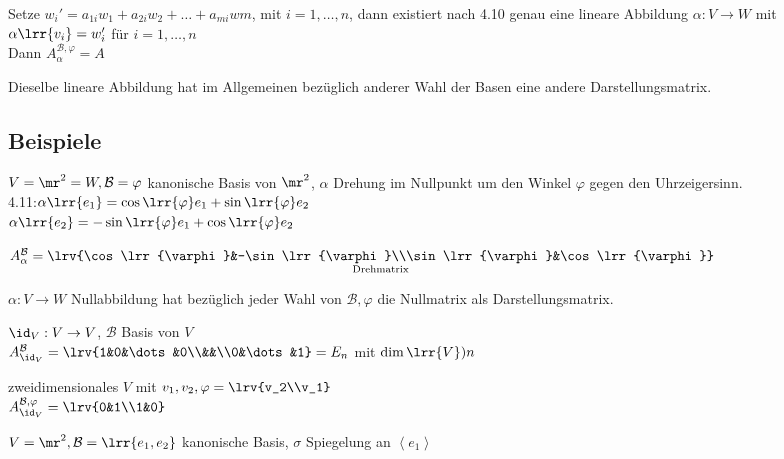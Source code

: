 			Setze $w_i'=a_{1i}w_1+a_{2i}w_2+\dots+a_{mi}w{m}$, mit $i=1,\dots,n$, dann existiert nach 4.10 genau eine lineare Abbildung $\alpha:V\rightarrow W$ mit $\alpha\lrr{v_i}=w_i'$ für $i=1,\dots,n$\\
			Dann $A_{\alpha}^{\mathcal{B}, \varphi}=A$
		\item Dieselbe lineare Abbildung hat im Allgemeinen bezüglich anderer Wahl der Basen eine andere Darstellungsmatrix.
	\subExEnd
	
\subsection{Beispiele}
		\item $V=\mr^2=W, \mathcal{B}=\varphi$ kanonische Basis von $\mr^2$, $\alpha$ Drehung im Nullpunkt um den Winkel $\varphi$ gegen den Uhrzeigersinn.\\
			4.11:$\alpha\lrr{e_1}=\cos\lrr{\varphi}e_1+\sin\lrr{\varphi}e_2$\\
			$\alpha\lrr{e_2}=-\sin\lrr{\varphi}e_1+\cos\lrr{\varphi}e_2$
			
			$A_{\alpha}^{\mathcal{B}}=\underset{\mbox{\scriptsize Drehmatrix}}{\lrv{\cos\lrr{\varphi}&-\sin\lrr{\varphi}\\\sin\lrr{\varphi}&\cos\lrr{\varphi}}}$
		\item $\alpha:V\rightarrow W$ Nullabbildung hat bezüglich jeder Wahl von $\mathcal{B},\varphi$ die Nullmatrix als Darstellungsmatrix.
		\item $\id_V:V\rightarrow V$, $\mathcal{B}$ Basis von $V$\\
			$A_{\id_V}^{\mathcal{B}}=\lrv{1&0&\dots&0\\&&\\0&\dots&1}=E_n$ mit $\dim\lrr{V})n$
		\item zweidimensionales $V$ mit $v_1,v_2,\varphi=\lrv{v_2\\v_1}$\\
			$A_{\id_V}^{\mathcal{B},\varphi}=\lrv{0&1\\1&0}$
		\item $V=\mr^2,\mathcal{B}=\lrr{e_1,e_2}$ kanonische Basis, $\sigma$ Spiegelung an $\left\langle e_1\right\rangle$


